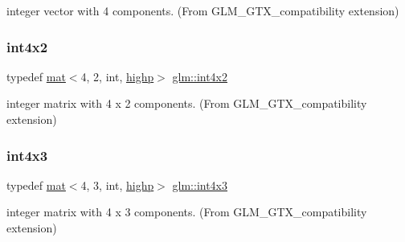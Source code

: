 integer vector with 4 components. (From G\+L\+M\+\_\+\+G\+T\+X\+\_\+compatibility extension) 

\mbox{\label{group__gtx__compatibility_ga217e382844361bca6a376e72efa4b360}} 
\subsubsection{\texorpdfstring{int4x2}{int4x2}}
{\footnotesize\ttfamily typedef \mbox{\hyperlink{structglm_1_1mat}{mat}}$<$4, 2, int, \mbox{\hyperlink{namespaceglm_a36ed105b07c7746804d7fdc7cc90ff25ac6f7eab42eacbb10d59a58e95e362074}{highp}}$>$ \mbox{\hyperlink{group__gtx__compatibility_ga217e382844361bca6a376e72efa4b360}{glm\+::int4x2}}}



integer matrix with 4 x 2 components. (From G\+L\+M\+\_\+\+G\+T\+X\+\_\+compatibility extension) 

\mbox{\label{group__gtx__compatibility_gadda7ab2670c41cbe997641db23ace3d2}} 
\subsubsection{\texorpdfstring{int4x3}{int4x3}}
{\footnotesize\ttfamily typedef \mbox{\hyperlink{structglm_1_1mat}{mat}}$<$4, 3, int, \mbox{\hyperlink{namespaceglm_a36ed105b07c7746804d7fdc7cc90ff25ac6f7eab42eacbb10d59a58e95e362074}{highp}}$>$ \mbox{\hyperlink{group__gtx__compatibility_gadda7ab2670c41cbe997641db23ace3d2}{glm\+::int4x3}}}



integer matrix with 4 x 3 components. (From G\+L\+M\+\_\+\+G\+T\+X\+\_\+compatibility extension) 

\mbox{\label{group__gtx__compatibility_ga4f4e5fb81339df0489d802fb9d574fd7}} 
